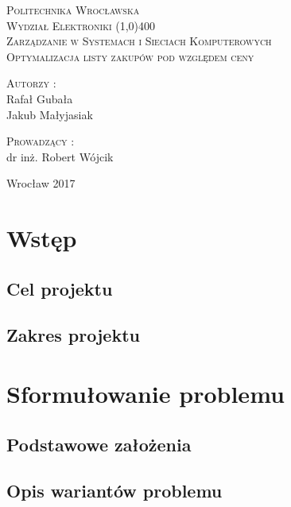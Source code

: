 \documentclass[a4paper]{article}
\let\oldsection\section
\renewcommand\section{\clearpage\oldsection}
\begin{document}
\begin{titlepage}
\begin{center}
\huge{\textsc{Politechnika Wrocławska\\Wydział Elektroniki}}
\line(1,0){400}\\
[1 cm]
\textsc{\Huge {Zarządzanie w Systemach i Sieciach Komputerowych}}\\
[0.5 cm]
\textsc{\Large {Optymalizacja listy zakupów pod względem ceny}}\\
\end{center}
\vfill
\vfill
\hspace{0.5 cm}
\begin{minipage}[t]{.4\textwidth}%
\flushleft
\textsc{\Large{Autorzy :}}\\
\Large{Rafał Gubała }\\
\Large{Jakub Małyjasiak}
\end{minipage}%
\begin{minipage}[t]{.5\textwidth}%
\flushright
\textsc{\Large{Prowadzący :}}\\
\Large{dr inż. Robert Wójcik}\\
\end{minipage}%
\vfill
\begin{center}
\normalsize{Wrocław 2017}
\end{center}
\end{titlepage}

\tableofcontents 
\listoffigures

\section{Wstęp}
\subsection{Cel projektu}
\subsection{Zakres projektu}

\section{Sformułowanie problemu}
\subsection{Podstawowe założenia}
\subsection{Opis wariantów problemu}
\end{document}
